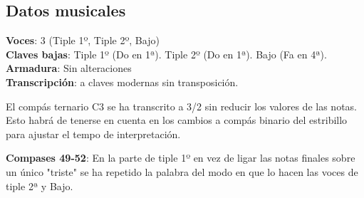 \subsection*{Datos musicales}

\noindent \textbf{Voces}: 3 (Tiple 1º, Tiple 2º, Bajo)\\
\textbf{Claves bajas}: Tiple 1º (Do en 1ª). Tiple 2º (Do en 1ª). Bajo
(Fa en 4ª).\\
\textbf{Armadura}: Sin alteraciones\\
\textbf{Transcripción}: a claves modernas sin transposición.


El compás ternario C3 se ha transcrito a 3/2 sin reducir los valores de
las notas. Esto habrá de tenerse en cuenta en los cambios a compás
binario del estribillo para ajustar el tempo de interpretación.


\noindent \textbf{Compases 49-52}: En la parte de tiple 1º en vez de ligar las notas finales sobre un único "triste" se ha repetido la palabra del modo en que lo hacen las voces de tiple 2ª y Bajo.
